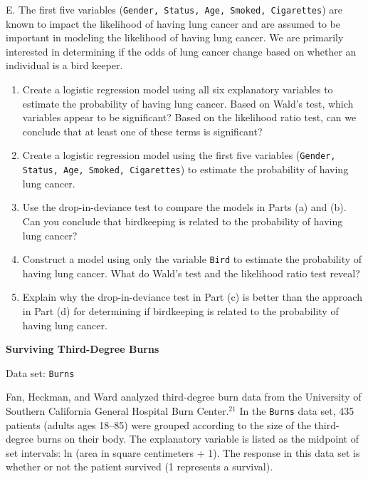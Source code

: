 \documentclass[
]{report}
\newcounter{excount}
\renewcommand{\theexcount}{E\arabic{excount}}
\begin{document}
\begin{list}{\theexcount.}{ \setlength{\itemsep}{1.2em}}
The first five variables (\texttt{Gender, Status, Age, Smoked, Cigarettes}) are known to impact the likelihood of having lung cancer and are assumed to be important in modeling the likelihood of having lung cancer. We are primarily interested in determining if the odds of lung cancer change based on whether an individual is a bird keeper.

  \begin{enumerate}
    \item Create a logistic regression model using all six explanatory variables to estimate the probability of having lung cancer. Based on Wald’s test, which variables appear to be significant? Based on the likelihood ratio test, can we conclude that at least one of these terms is significant?
    \item Create a logistic regression model using the first five variables (\texttt{Gender, Status, Age, Smoked, Cigarettes}) to estimate the probability of having lung cancer. 
    \item Use the drop-in-deviance test to compare the models in Parts (a) and (b). Can you conclude that birdkeeping is related to the probability of having lung cancer?
    \item Construct a model using only the variable \texttt{Bird} to estimate the probability of having lung cancer. What do Wald’s test and the likelihood ratio test reveal?
    \item Explain why the drop-in-deviance test in Part (c) is better than the approach in Part (d) for determining if birdkeeping is related to the probability of having lung cancer.
  \end{enumerate}

  \item \textbf{Surviving Third-Degree Burns}

Data set: \texttt{Burns}

Fan, Heckman, and Ward analyzed third-degree burn data from the University of Southern California General Hospital Burn Center.$^{21}$ In the \texttt{Burns} data set, 435 patients (adults ages 18–85) were grouped according to the size of the third-degree burns on their body. The explanatory variable is listed as the midpoint of set intervals: ln (area in square centimeters + 1). The response in this data set is whether or not the patient survived (1 represents a survival).


\end{list}
\end{document}

